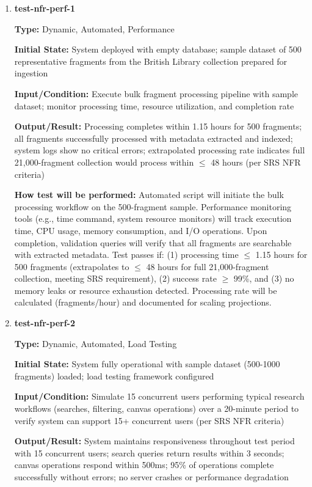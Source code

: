 \documentclass[12pt, titlepage]{article}
\begin{document}
\begin{enumerate}

\item \textbf{test-nfr-perf-1}

\textbf{Type:} Dynamic, Automated, Performance

\textbf{Initial State:} System deployed with empty database; sample dataset of 500 representative fragments from the British Library collection prepared for ingestion

\textbf{Input/Condition:} Execute bulk fragment processing pipeline with sample dataset; monitor processing time, resource utilization, and completion rate

\textbf{Output/Result:} Processing completes within 1.15 hours for 500 fragments; all fragments successfully processed with metadata extracted and indexed; system logs show no critical errors; extrapolated processing rate indicates full 21,000-fragment collection would process within $\leq$ 48 hours (per SRS NFR criteria)

\textbf{How test will be performed:} Automated script will initiate the bulk processing workflow on the 500-fragment sample. Performance monitoring tools (e.g., time command, system resource monitors) will track execution time, CPU usage, memory consumption, and I/O operations. Upon completion, validation queries will verify that all fragments are searchable with extracted metadata. Test passes if: (1) processing time $\leq$ 1.15 hours for 500 fragments (extrapolates to $\leq$ 48 hours for full 21,000-fragment collection, meeting SRS requirement), (2) success rate $\geq$ 99\%, and (3) no memory leaks or resource exhaustion detected. Processing rate will be calculated (fragments/hour) and documented for scaling projections.

\item \textbf{test-nfr-perf-2}

\textbf{Type:} Dynamic, Automated, Load Testing

\textbf{Initial State:} System fully operational with sample dataset (500-1000 fragments) loaded; load testing framework configured

\textbf{Input/Condition:} Simulate 15 concurrent users performing typical research workflows (searches, filtering, canvas operations) over a 20-minute period to verify system can support 15+ concurrent users (per SRS NFR criteria)

\textbf{Output/Result:} System maintains responsiveness throughout test period with 15 concurrent users; search queries return results within 3 seconds; canvas operations respond within 500ms; 95\% of operations complete successfully without errors; no server crashes or performance degradation


\end{enumerate}
\end{document}
